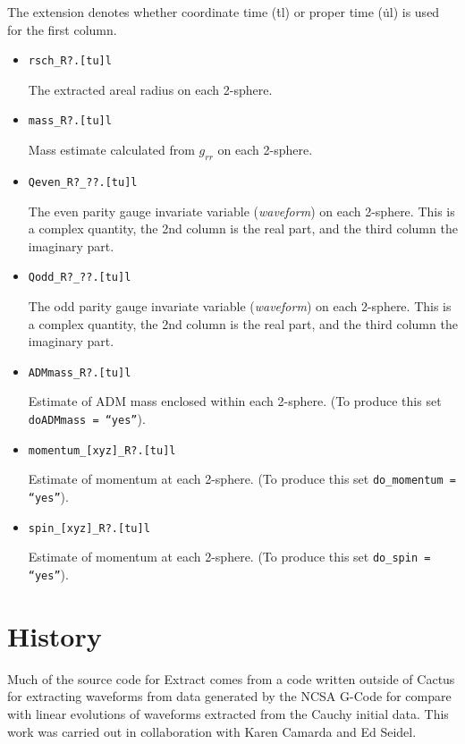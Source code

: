 The extension denotes whether coordinate time ({\.tl}) or proper time
({\.ul}) is used for the first column.

\begin{itemize}

  \item {\tt rsch\_R?.[tu]l} 

	The extracted areal radius on each 2-sphere.

  \item {\tt mass\_R?.[tu]l}

	Mass estimate calculated from $g_{rr}$ on each 2-sphere.

  \item {\tt Qeven\_R?\_??.[tu]l}

	The even parity gauge invariate variable ({\it waveform}) on 
	each 2-sphere. This is a complex quantity, the 2nd column is 
	the real part, and the third column the imaginary part.

  \item {\tt Qodd\_R?\_??.[tu]l}

	The odd parity gauge invariate variable ({\it waveform}) on 
	each 2-sphere. This is a complex quantity, the 2nd column is 
	the real part, and the third column the imaginary part.

  \item {\tt ADMmass\_R?.[tu]l}

	Estimate of ADM mass enclosed within each 2-sphere.
	(To produce this set {\tt doADMmass = ``yes''}).

  \item {\tt momentum\_[xyz]\_R?.[tu]l}

	Estimate of momentum at each 2-sphere.
	(To produce this set {\tt do\_momentum = ``yes''}).

  \item {\tt spin\_[xyz]\_R?.[tu]l}

	Estimate of momentum at each 2-sphere.
	(To produce this set {\tt do\_spin = ``yes''}).


\end{itemize}

\section{History}

Much of the source code
 for Extract comes from a code written outside
of Cactus for extracting waveforms from data generated by the NCSA
G-Code for compare with linear evolutions of waveforms extracted from
the Cauchy initial data.  This work was carried out in collaboration
with Karen Camarda and Ed Seidel.


